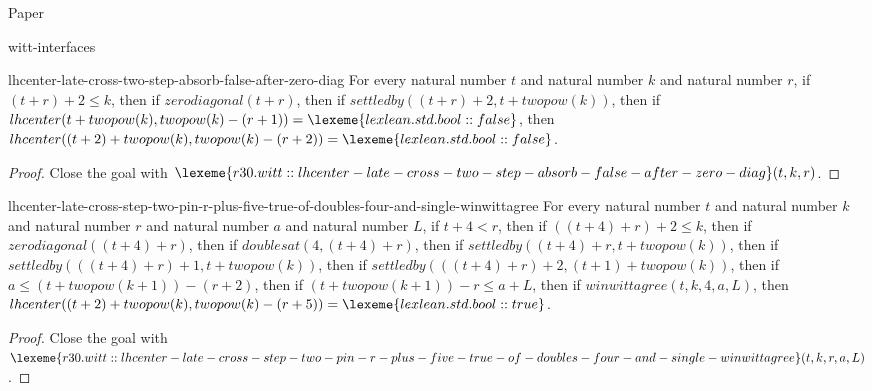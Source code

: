 \begin{lexlean}{Paper}
\begin{section}{witt-interfaces}
  \begin{theorem}{lhcenter-late-cross-two-step-absorb-false-after-zero-diag}
  For every natural number \(t\) and natural number \(k\) and natural number \(r\), if \((t + r) + 2 ≤ k\), then if \(zerodiagonal(t + r)\), then if \(settledby((t + r) + 2, t + twopow(k))\), then if \(lhcenter(t + twopow(k), twopow(k) - (r + 1)) = \lexeme{lexlean.std.bool::false}\), then \(lhcenter((t + 2) + twopow(k), twopow(k) - (r + 2)) = \lexeme{lexlean.std.bool::false}\).
  \begin{proof}
  Close the goal with \(\lexeme{r30.witt::lhcenter-late-cross-two-step-absorb-false-after-zero-diag}(t, k, r)\).
  \end{proof}
  \end{theorem}

  \begin{theorem}{lhcenter-late-cross-step-two-pin-r-plus-five-true-of-doubles-four-and-single-winwittagree}
  For every natural number \(t\) and natural number \(k\) and natural number \(r\) and natural number \(a\) and natural number \(L\), if \(t + 4 < r\), then if \(((t + 4) + r) + 2 ≤ k\), then if \(zerodiagonal((t + 4) + r)\), then if \(doublesat(4, (t + 4) + r)\), then if \(settledby((t + 4) + r, t + twopow(k))\), then if \(settledby(((t + 4) + r) + 1, t + twopow(k))\), then if \(settledby(((t + 4) + r) + 2, (t + 1) + twopow(k))\), then if \(a ≤ (t + twopow(k + 1)) - (r + 2)\), then if \((t + twopow(k + 1)) - r ≤ a + L\), then if \(winwittagree(t, k, 4, a, L)\), then \(lhcenter((t + 2) + twopow(k), twopow(k) - (r + 5)) = \lexeme{lexlean.std.bool::true}\).
  \begin{proof}
  Close the goal with \(\lexeme{r30.witt::lhcenter-late-cross-step-two-pin-r-plus-five-true-of-doubles-four-and-single-winwittagree}(t, k, r, a, L)\).
  \end{proof}
  \end{theorem}


\end{section}
\end{lexlean}
